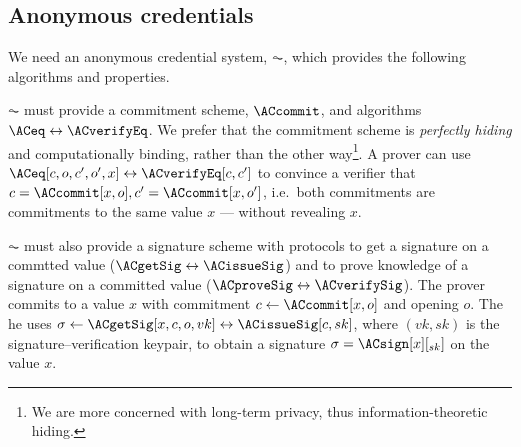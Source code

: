 \subsection{Anonymous credentials}%
\label{ZK-anon-cred}



We need an anonymous credential system, \(\AC\), which provides the following 
algorithms and properties.


\(\AC\) must provide a commitment scheme, \(\ACcommit\), and algorithms 
\(\ACeq\leftrightarrow \ACverifyEq\).
We prefer that the commitment scheme is \emph{perfectly hiding} and 
computationally binding, rather than the other way\footnote{%
  We are more concerned with long-term privacy, thus information-theoretic 
  hiding.
}.
A prover can use \(\ACeq[c, o, c', o', x]\leftrightarrow \ACverifyEq[c, c']\) to 
convince a verifier that \(c = \ACcommit[x, o], c' = \ACcommit[x, o']\), i.e.\ 
both commitments are commitments to the same value \(x\) --- without revealing 
\(x\).



\(\AC\) must also provide a signature scheme with protocols to get a signature 
on a commtted value (\(\ACgetSig\leftrightarrow \ACissueSig\)) and to prove 
knowledge of a signature on a committed value (\(\ACproveSig\leftrightarrow 
  \ACverifySig\)).
The prover commits to a value \(x\) with commitment \(c\gets \ACcommit[x, o]\) 
and opening \(o\).
The he uses \(\sigma\gets \ACgetSig[x, c, o, vk]\leftrightarrow \ACissueSig[c, 
  sk]\), where \((vk, sk)\) is the signature--verification keypair, to obtain a 
signature \(\sigma = \ACsign[x][_{sk}]\) on the value \(x\).

